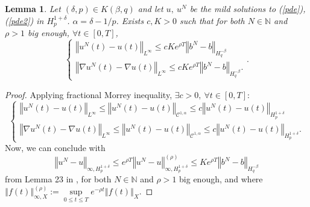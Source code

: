 \documentclass[12pt]{article}
\newtheorem{lem}[theo]{Lemma}
\newcommand{\norme}[1]{\left\Vert #1\right\Vert}
\newcommand{\N}{\mathbb{N}}
\begin{document}
    \begin{lem}\label{morrey} Let $(\delta,p)\in K(\beta,q)$ and let $u,\ u^N$ be the mild solutions to (\ref{pde}),(\ref{pde2}) in $H_p^{1+\delta}$. $\alpha = \delta - 1/p$. Exists $c,K>0$ such that for both $N\in\N$ and $\rho>1$ big enough, $\forall t\in[0,T]$,
        \begin{equation}
        \begin{cases}
        \norme{u^N(t) - u(t)}_{L^\infty}\leq cKe^{\rho T}\norme{b^N-b}_{H^{-\beta}_{q}}\\        
        \norme{\nabla u^N(t) - \nabla u(t)}_{L^\infty}\leq c Ke^{\rho T}\norme{b^N-b}_{H^{-\beta}_{q}}.
        \end{cases} .
        \end{equation}
    \end{lem}    
    
    \begin{proof}
        Applying fractional Morrey inequality, $\exists c>0,\ \forall t\in[0,T]$:
        \begin{equation*}
        \begin{cases}
        \norme{u^N(t) - u(t)}_{L^\infty}\leq\norme{u^N(t) - u(t)}_{\mathcal{C}^{1,\alpha}}\leq c\norme{u^N(t)-u(t)}_{H^{1+\delta}_{p}}\\        
        \norme{\nabla u^N(t) - \nabla u(t)}_{L^\infty}\leq\norme{u^N(t) - u(t)}_{\mathcal{C}^{1,\alpha}}\leq c\norme{u^N(t)-u(t)}_{H^{1+\delta}_{p}}.
        \end{cases}        
        \end{equation*}        
        Now, we can conclude with
        \begin{equation*}
        \norme{u^N-u}_{\infty,H^{1+\delta}_{p}}\leq e^{\rho T} \norme{u^N-u}_{\infty,H^{1+\delta}_{p}}^{(\rho)}\leq Ke^{\rho T}\norme{b^N-b}_{H^{-\beta}_{q}}
        \end{equation*} from Lemma 23 in \cite{Fla-Iss-Rus-2017}, for both $N\in\N$ and $\rho>1$ big enough, and where $\norme{f(t)}_{\infty,X}^{(\rho)} := \underset{0\leq t\leq T}{\sup} e^{-\rho t} \norme{f(t)}_X$.
    \end{proof}
        
\end{document}
